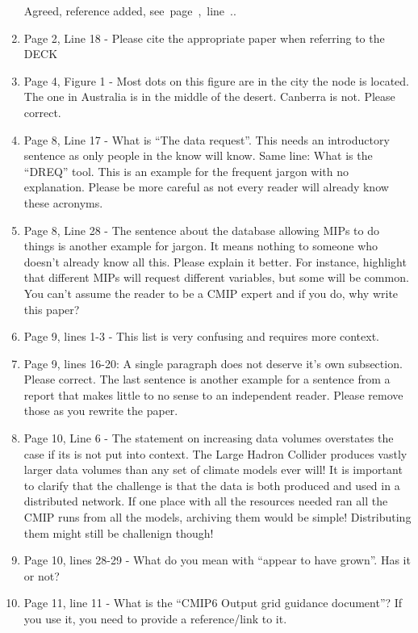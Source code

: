\documentclass[gmd,manuscript]{copernicus}
\newcommand{\plref}[1]{\mbox{see page \pageref{p-#1}, line
    \lineref{l-#1}.}}
\newenvironment{answer}{\color{blue}}{}
\begin{document}
\begin{enumerate}[label=RC3-\arabic*,leftmargin=*]
  \begin{answer}
    Agreed, reference added, \plref{RC1-6}.
  \end{answer}
\item Page 2, Line 18 - Please cite the appropriate paper when
  referring to the DECK
\item Page 4, Figure 1 - Most dots on this figure are in the city the
  node is located. The one in Australia is in the middle of the
  desert. Canberra is not. Please correct.
\item Page 8, Line 17 - What is “The data request”. This needs an
  introductory sentence as only people in the know will know. Same
  line: What is the “DREQ” tool. This is an example for the frequent
  jargon with no explanation. Please be more careful as not every
  reader will already know these acronyms.
\item Page 8, Line 28 - The sentence about the database allowing MIPs
  to do things is another example for jargon. It means nothing to
  someone who doesn’t already know all this. Please explain it better.
  For instance, highlight that different MIPs will request different
  variables, but some will be common. You can’t assume the reader to
  be a CMIP expert and if you do, why write this paper?
\item Page 9, lines 1-3 - This list is very confusing and requires
  more context.
\item Page 9, lines 16-20: A single paragraph does not deserve it’s own
  subsection. Please correct. The last sentence is another example for
  a sentence from a report that makes little to no sense to an
  independent reader. Please remove those as you rewrite the paper.
\item Page 10, Line 6 - The statement on increasing data volumes
  overstates the case if its is not put into context. The Large Hadron
  Collider produces vastly larger data volumes than any set of climate
  models ever will! It is important to clarify that the challenge is
  that the data is both produced and used in a distributed network. If
  one place with all the resources needed ran all the CMIP runs from
  all the models, archiving them would be simple! Distributing them
  might still be challenign though!
\item Page 10, lines 28-29 - What do you mean with “appear to have
  grown”. Has it or not?
\item Page 11, line 11 - What is the “CMIP6 Output grid guidance
  document”? If you use it, you need to provide a reference/link to
  it.


\end{enumerate}
\end{document}
